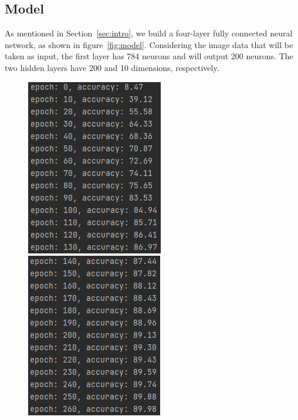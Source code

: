 \documentclass[twoside,twocolumn]{article}
\begin{document}
\subsection{Model}

As mentioned in Section~\ref{sec:intro}, we build a four-layer fully connected neural network, as shown in figure~\ref{fig:model}. Considering the image data that will be taken as input, the first layer has 784 neurons and will output 200 neurons. The two hidden layers have 200 and 10 dimensions, respectively.


\begin{figure}[t]
	\centering
	\begin{minipage}[t]{0.3\textwidth}
		\centering
		\includegraphics[scale=0.7, clip=true]{fig/1.png}
	\end{minipage}
	\begin{minipage}[t]{0.3\textwidth}
		\centering
		\includegraphics[scale=0.7, clip=true]{fig/2.png}
	\end{minipage}
	\begin{minipage}[t]{0.3\textwidth}

\end{minipage}
\end{figure}
\end{document}
